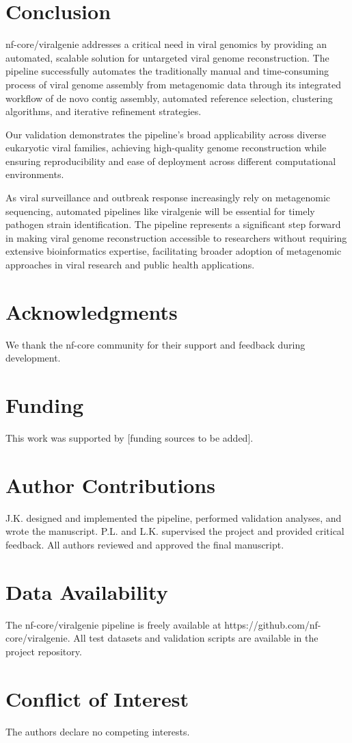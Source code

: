 \section{Conclusion}

nf-core/viralgenie addresses a critical need in viral genomics by providing an automated, scalable solution for untargeted viral genome reconstruction. The pipeline successfully automates the traditionally manual and time-consuming process of viral genome assembly from metagenomic data through its integrated workflow of de novo contig assembly, automated reference selection, clustering algorithms, and iterative refinement strategies.

Our validation demonstrates the pipeline's broad applicability across diverse eukaryotic viral families, achieving high-quality genome reconstruction while ensuring reproducibility and ease of deployment across different computational environments.

As viral surveillance and outbreak response increasingly rely on metagenomic sequencing, automated pipelines like viralgenie will be essential for timely pathogen strain identification. The pipeline represents a significant step forward in making viral genome reconstruction accessible to researchers without requiring extensive bioinformatics expertise, facilitating broader adoption of metagenomic approaches in viral research and public health applications.

\section*{Acknowledgments}
We thank the nf-core community for their support and feedback during development.

\section*{Funding}
This work was supported by [funding sources to be added].

\section*{Author Contributions}
J.K. designed and implemented the pipeline, performed validation analyses, and wrote the manuscript. P.L. and L.K. supervised the project and provided critical feedback. All authors reviewed and approved the final manuscript.

\section*{Data Availability}
The nf-core/viralgenie pipeline is freely available at https://github.com/nf-core/viralgenie. All test datasets and validation scripts are available in the project repository.

\section*{Conflict of Interest}
The authors declare no competing interests.
